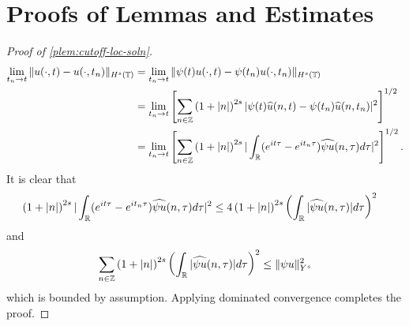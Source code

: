  \section{Proofs of Lemmas and Estimates}
\begin{proof}[Proof of \cref{plem:cutoff-loc-soln}]
%
%
\begin{equation*}
  \begin{split}
    \lim_{t_{n} \to t} \|u(\cdot, t) - u(\cdot, t_{n})\|_{H^s(\mathbb{T})} 
    & = \lim_{t_{n} \to t} \|\psi(t) u(\cdot, t) - \psi(t_n) u(\cdot, t_{n})\|_{H^s(\mathbb{T})} 
    \\
    & = \lim_{t_n \to t} \left[ \sum_{n \in \mathbb{Z}}\left( 1 + | n |
    \right)^{2s} | \psi(t)  \widehat{u}(n, t) - \psi(t_n) \widehat{ u}(n, t_n) |^2 \right]^{1/2}
    \\
    & = \lim_{t_n \to t} \left[ \sum_{n \in \mathbb{Z}} \left( 1 + | n |
    \right)^{2s} | \int_{\mathbb{R}} (e^{it \tau} - e^{it_{n} \tau}) \widehat{\psi u}(n,
    \tau) d \tau |^2 \right]^{1/2}.
  \end{split}
\end{equation*}
    It is clear that
    \begin{equation*}
      \begin{split}
        \left( 1 + | n |
        \right)^{2s} | \int_{\mathbb{R}} (e^{it \tau} - e^{it_{n}\tau}) \widehat{\psi u}(n, \tau) d \tau |^2 
    & \le 4  \left( 1 + | n |
    \right)^{2s} \left ( \int_{\mathbb{R}} |\widehat{\psi u}(n, \tau)| d \tau
    \right )^2 
  \end{split}
\end{equation*}
and 
%
%
\begin{equation*}
  \begin{split}
 \sum_{n \in \mathbb{Z}} \left( 1 + | n |
    \right)^{2s} \left ( \int_{\mathbb{R}} |\widehat{\psi u}(n, \tau)| d \tau
    \right ) ^2 
    \le \|\psi u \|_{Y^s}^2 
  \end{split}
\end{equation*}
which is bounded by assumption.
Applying dominated convergence completes the proof. 
\end{proof}
%
%
